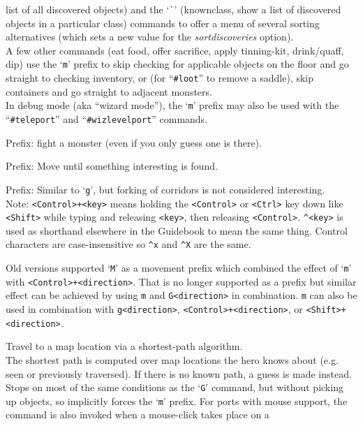 list of all discovered objects) and the `{\tt \`{}}' (knownclass,
show a list of discovered objects in a particular class) commands to offer
a menu of several sorting alternatives (which sets a new value for the
{\it sortdiscoveries\/} option).
\\
A few other commands (eat food, offer sacrifice, apply tinning-kit,
drink/quaff, dip) use
the `{\tt m}' prefix to skip checking for applicable objects on
the floor and go straight to checking inventory,
or (for ``{\tt \#loot}'' to remove a saddle),
skip containers and go straight to adjacent monsters.
\\
In debug mode (aka ``wizard mode''), the `{\tt m}' prefix may also be
used with the ``{\tt \#teleport}'' and ``{\tt \#wizlevelport}'' commands.
\item[\tb{F[yuhjklbn]}]
Prefix:  fight a monster (even if you only guess one is there).
\item[\tb{g[yuhjklbn]}]
Prefix:  Move until something interesting is found.
\item[\tb{G[yuhjklbn] {\rm or} <Control>+[yuhjklbn]}]
Prefix:  Similar to `{\tt g}', but forking of corridors is not considered
interesting.
\\
Note:  {\tt <Control>+<key>} means holding the {\tt <Control>} or
{\tt <Ctrl>} key down like {\tt <Shift>} while typing and releasing
{\tt <key>}, then releasing {\tt <Control>}.  {\tt \^{}<key>} is used as
shorthand elsewhere in the Guidebook to mean the same thing.  Control
characters are case-insensitive so {\tt \^{}x} and {\tt \^{}X} are the same.
\item[\tb{M[yuhjklbn]}]
Old versions supported `{\tt M}' as a movement prefix which
combined the effect of `{\tt m}' with {\tt <Control>+<direction>}.
That is no longer supported as a prefix but similar effect can be achieved
by using {\tt m} and {\tt G<direction>} in combination.
{\tt m} can also be used in combination with {\tt g<direction>},
{\tt <Control>+<direction>}, or {\tt <Shift>+<direction>}.
\item[\tb{\tt \verb+_+}]
Travel to a map location via a shortest-path algorithm.\\
The shortest path
is computed over map locations the hero knows about (e.g. seen or
previously traversed).
If there is no known path, a guess is made instead.
Stops on most of
the same conditions as the `{\tt G}' command, but without picking up
objects, so implicitly forces the `{\tt m}' prefix.
For ports with mouse
support, the command is also invoked when a mouse-click takes place on a
